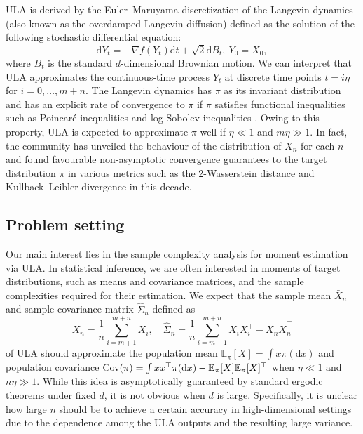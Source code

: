\documentclass[12pt,reqno]{amsart}
\theoremstyle{remark}
\theoremstyle{definition}
\newcommand{\E}{\mathbb{E}}
\newcommand{\Cov}{\textnormal{Cov}}
\newcommand{\diff}{\mathrm{d}}
\begin{document}
ULA is derived by the Euler--Maruyama discretization of the Langevin dynamics (also known as the overdamped Langevin diffusion) defined as the solution of the following stochastic differential equation:
\begin{equation*}
    \diff Y_{t}=-\nabla f(Y_{t})\diff t+\sqrt{2}\diff B_{t},\ Y_{0}=X_{0},
\end{equation*}
where $B_{t}$ is the standard $d$-dimensional Brownian motion.
We can interpret that ULA approximates the continuous-time process $Y_{t}$ at discrete time points $t=i\eta$ for $i=0,\ldots,m+n$.
The Langevin dynamics has $\pi$ as its invariant distribution and has an explicit rate of convergence to $\pi$ if $\pi$ satisfies functional inequalities such as Poincar\'{e} inequalities and log-Sobolev inequalities \citep{bakry2014analysis}.
Owing to this property, ULA is expected to approximate $\pi$ well if $\eta\ll1$ and $m\eta\gg1$.
In fact, the community has unveiled the behaviour of the distribution of $X_{n}$ for each $n$ \citep[e.g.,][]{dalalyan2017theoretical,durmus2017nonasymptotic,durmus2019high,vempala2019rapid} and found favourable non-asymptotic convergence guarantees to the target distribution $\pi$ in various metrics such as the 2-Wasserstein distance and Kullback--Leibler divergence in this decade.

\subsection{Problem setting}\label{sec:intro:setting}
Our main interest lies in the sample complexity analysis for moment estimation via ULA.
In statistical inference, we are often interested in moments of target distributions, such as means and covariance matrices, and the sample complexities required for their estimation. 
We expect that the sample mean $\bar{X}_{n}$ and sample covariance matrix $\hat{\Sigma}_{n}$ defined as
\begin{equation}\label{eq:def:samplemoments}
    \bar{X}_{n}=\frac{1}{n}\sum_{i=m+1}^{m+n}X_{i},\quad \hat{\Sigma}_{n}=\frac{1}{n}\sum_{i=m+1}^{m+n}X_{i}X_{i}^{\top}-\bar{X}_{n}\bar{X}_{n}^{\top}
\end{equation}
of ULA should approximate the population mean $\E_{\pi}[X]=\int x\pi(\diff x)$ and population covariance $\Cov(\pi)=\int xx^{\top}\pi(\diff x)-\E_{\pi}[X]\E_{\pi}[X]^{\top}$ when $\eta\ll1$ and $n\eta\gg1$.
While this idea is asymptotically guaranteed by standard ergodic theorems under fixed $d$, it is not obvious when $d$ is large.
Specifically, it is unclear how large $n$ should be to achieve a certain accuracy in high-dimensional settings due to the dependence among the ULA outputs and the resulting large variance.
\end{document}
